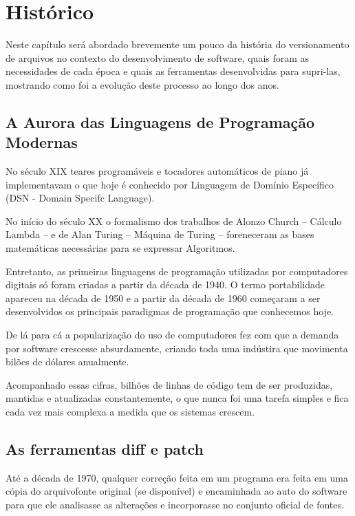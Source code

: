 \chapter{Histórico}

Neste capítulo será abordado brevemente um pouco da história do versionamento de arquivos
no contexto do desenvolvimento de software, quais foram as necessidades de cada época e quais
as ferramentas desenvolvidas para supri-las, mostrando como foi a evolução deste processo
ao longo dos anos.

\section{A Aurora das Linguagens de Programação Modernas}

No século XIX teares programáveis e tocadores automáticos de piano já implementavam o que
hoje é conhecido por Linguagem de Domínio Específico (DSN - Domain Specifc Language).

No início do século XX  o formalismo dos trabalhos de Alonzo Church -- Cálculo Lambda -- \cite{Church} e
de Alan Turing -- Máquina de Turing -- \cite{Turing} foreneceram as bases matemáticas necessárias para se
expressar Algoritmos.
 
Entretanto, as primeiras linguagens de programação utilizadas por computadores digitais
só foram criadas a partir da década de 1940. O termo portabilidade apareceu na década de
1950 e a partir da década de 1960 começaram a ser desenvolvidos os principais paradigmas
de programação que conhecemos hoje.

De lá para cá a popularização do uso de computadores fez com que a demanda por software
crescesse absurdamente, criando toda uma indústira que movimenta bilões de dólares anualmente.

Acompanhado essas cifras, bilhões de linhas de código tem de ser produzidas, mantidas e atualizadas constantemente, o que nunca foi uma tarefa simples e fica cada vez mais complexa a medida
que os sistemas crescem.

\section{As ferramentas diff e patch}

Até a década de 1970, qualquer correção feita em um programa era feita em
uma cópia do arquivofonte original (se disponível) e encaminhada ao auto
do software para que ele analisasse as alterações e incorporasse no
conjunto oficial de fontes.

